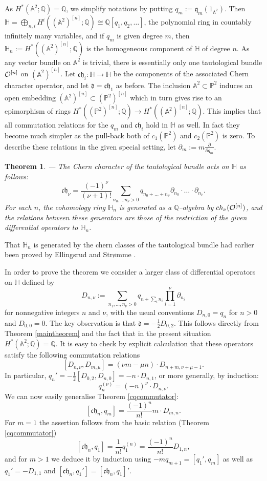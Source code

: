 \documentclass[twoside,11pt]{article}
\newtheorem{theorem}{Theorem}[section]
\newcommand{\ko}{{\cal O}}
\newcommand{\IA}{{\mathbb A}}
\newcommand{\IH}{{\mathbb H}}
\newcommand{\IP}{{\mathbb P}}
\newcommand{\IQ}{{\mathbb Q}}
\newcommand{\gothc}{{\mathfrak c}}
\newcommand{\gothd}{{\mathfrak d}}
\newcommand{\gothh}{{\mathfrak h}}
\newcommand{\gothq}{{\mathfrak q}}
\newcommand{\isom}{\cong}
\newcommand{\dd}{\gothd}
\newcommand{\qq}{\gothq}
\newcommand{\ch}{{\gothc\gothh}}
\begin{document}
As $H^*(\IA^2;\IQ)=\IQ$, we simplify notations by putting $q_m:=\qq_m(1_{\IA^2})$.
Then $\IH=\bigoplus_{n,i}H^i((\IA^2)^{[n]};\IQ)\isom \IQ[q_1,q_2,\ldots]$, the polynomial ring in countably infinitely many variables, and if $q_m$ is given 
degree $m$, then $\IH_n:=H^*((\IA^2)^{[n]};\IQ)$ is the homogeneous component of 
$\IH$ of degree $n$. As any vector bundle on $\IA^2$ is trivial, there is essentially only one tautological bundle $\ko^{[n]}$ on $(\IA^2)^{[n]}$. Let 
$\ch_i:\IH\to\IH$ be the components of the associated
Chern character operator, and let $\dd=\ch_1$ as before. The inclusion 
$\IA^2\subset\IP^2$ induces an open embedding $(\IA^2)^{[n]}\subset(\IP^2)^{[n]}$ which in turn gives rise to an epimorphism
of rings $H^*((\IP^2)^{[n]};\IQ)\to H^*((\IA^2)^{[n]};\IQ)$. This implies that
all commutation relations for the $q_m$ and $\ch_i$ hold in $\IH$ as well. In
fact they become much simpler as the pull-back both of $c_1(\IP^2)$ and $c_2(\IP^2)$ is zero.
To describe these relations in the given special setting, let $\partial_m:=m\frac{\partial}{\partial q_m}$. 

\begin{theorem}\label{chDidentification}--- The Chern character of the tautological bundle acts on $\IH$
as follows:
$$\ch_\nu=\frac{(-1)^\nu}{(\nu+1)!}\sum_{n_0,\ldots n_\nu>0}q_{n_0+\ldots+n_\nu}\partial_{n_0}\cdot\ldots\cdot\partial_{n_\nu}.$$
For each $n$, the cohomology ring $\IH_n$ is generated as a $\IQ$--algebra
by $ch_\nu(\ko^{[n]})$, and the relations between these generators are those
of the restriction of the given differential operators to $\IH_n$.
\end{theorem}

That $\IH_n$ is generated by the chern classes of the tautological bundle
had earlier been proved by Ellingsrud and Str\o{}mme \cite{EllStr2}.

In order to prove the theorem we consider a larger class of differential
operators on $\IH$ defined by
$$D_{n,\nu}:=\sum_{n_1,\ldots,n_\nu>0}q_{n+\sum_i n_i}
\prod_{i=1}^\nu\partial_{n_i}$$
for nonnegative integers $n$ and $\nu$, with the usual conventions
$D_{n,0}=q_n$ for $n>0$ and $D_{0,0}=0$.
The key observation is that $\dd=-\frac{1}{2}D_{0,2}$. This follows 
directly from Theorem \ref{maintheorem} and the fact that in the present
situation $H^*(\IA^2;\IQ)=\IQ$. It is easy to check by explicit calculation
that these operators satisfy the following commutation relations
$$[D_{n,\nu},D_{m,\mu}]=(\nu m-\mu n)\cdot D_{n+m,\nu+\mu-1}.$$
In particular, $q_n'=-\frac{1}{2}[D_{0,2},D_{n,0}]=-n\cdot D_{n,1}$, or more generally, by induction:
$$q_n^{(\nu)}=(-n)^{\nu}\cdot D_{n,\nu}.$$
We can now easily generalise Theorem \ref{cqcommutator}:
$$[\ch_n,q_m]=\frac{(-1)^n}{n!}m\cdot D_{m,n}.$$
For $m=1$ the assertion follows from the basic relation (Theorem \ref{cqcommutator}) $$[\ch_n,q_1]=\frac{1}{n!}q_1^{(n)}=\frac{(-1)^n}{n!}D_{1,n},$$
and for $m>1$ we deduce it by induction using
$-mq_{m+1}=[q_1',q_m]$ as well as $q_1'=-D_{1,1}$ and
$[\ch_n,q_1']=[\ch_n,q_1]'$.
\end{document}
